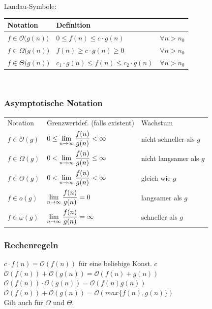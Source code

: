 \documentclass[fs, footer]{latex4ei}
\begin{document}
\begin{multicols*}{4}
Landau-Symbole:\\
\begin{tabular}{l|ll}
	Notation & Definition\\ \hline
	$f \in \mathcal O \bigl(g(n)\bigr)$ & $0 \le f(n) \le c \cdot g(n)$ & $\forall n > n_0$\\
	$f \in \Omega \bigl(g(n)\bigr)$ & $f(n) \ge c \cdot g(n) \ge 0$ & $\forall n > n_0$\\
	$f \in \Theta \bigl( g(n) \bigr)$ &  $c_1 \cdot g(n) \le f(n) \le c_2 \cdot g(n)$ & $\forall n > n_0$\\
\end{tabular}\\
\subsubsection{Asymptotische Notation}
\begin{tabular}{l|l|l}
Notation & Grenzwertdef. (falls existent) & Wachstum \\
\brule
$f \in \mathcal O (g)$ & $0 \leq \lim_{n \rightarrow \infty}\fr{f(n)}{g(n)} < \infty$ & nicht schneller als $g$\\
$f \in \Omega (g)$ & $0 < \lim_{n \rightarrow \infty}\fr{f(n)}{g(n)} \leq \infty$ & nicht langsamer als $g$\\
$f \in \Theta (g)$ & $0 < \lim_{n \rightarrow \infty}\fr{f(n)}{g(n)} < \infty$ & gleich wie $g$\\
$f \in o(g)$ & $\lim_{n \rightarrow \infty}\fr{f(n)}{g(n)} = 0$ & langsamer als $g$\\
$f \in \omega (g)$ & $\lim_{n \rightarrow \infty}\fr{f(n)}{g(n)} = \infty$ & schneller als $g$\\
\end{tabular}

\subsubsection{Rechenregeln}

$c \cdot f(n) = \mathcal O(f(n))$ für eine beliebige Konst. $c$\\
$\mathcal O(f(n)) + \mathcal O(g(n)) = \mathcal O(f(n) + g(n))$\\
$\mathcal O(f(n)) \cdot \mathcal O(g(n)) = \mathcal O(f(n)g(n))$\\
$\mathcal O(f(n)) + \mathcal O(g(n)) = \mathcal O(max\{f(n),g(n)\})$\\
Gilt auch für $\Omega$ und $\Theta$.


\end{multicols*}
\end{document}
